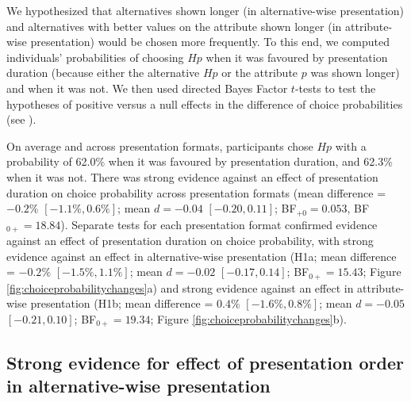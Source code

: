 \documentclass[11pt, a4paper, twocolumn, abstract]{scrartcl}
\begin{document}
We hypothesized that alternatives shown longer (in alternative-wise presentation) and alternatives with better values on the attribute shown longer (in attribute-wise presentation) would be chosen more frequently. 
To this end, we computed individuals' probabilities of choosing $Hp$ when it was favoured by presentation duration (because either the alternative $Hp$ or the attribute $p$ was shown longer) and when it was not. We then used directed Bayes Factor $t$-tests to test the hypotheses of positive versus a null effects in the difference of choice probabilities (see ). 

On average and across presentation formats, participants chose $Hp$ with a probability of 62.0\% when it was favoured by presentation duration, and 62.3\% when it was not.
There was strong evidence against an effect of presentation duration on choice probability across presentation formats (mean difference = $-0.2\%$ $[-1.1\%, 0.6\%]$; mean $d = -0.04$ $[-0.20, 0.11]$; BF$_{{+}0} = 0.053$, BF$_{0{+}} = 18.84$).
Separate tests for each presentation format confirmed evidence against an effect of presentation duration on choice probability, with strong evidence against an effect in alternative-wise presentation (H1a; mean difference = $-0.2\%$ $[-1.5\%, 1.1\%]$; mean $d = -0.02$ $[-0.17, 0.14]$; BF$_{0{+}} = 15.43$; Figure \ref{fig:choiceprobabilitychanges}a) and strong evidence against an effect in attribute-wise presentation (H1b; mean difference = $0.4\%$ $[-1.6\%, 0.8\%]$; mean $d = -0.05$ $[-0.21, 0.10]$; BF$_{0{+}} = 19.34$; Figure \ref{fig:choiceprobabilitychanges}b). 

\subsection*{Strong evidence for effect of presentation order in alternative-wise presentation}
\end{document}
